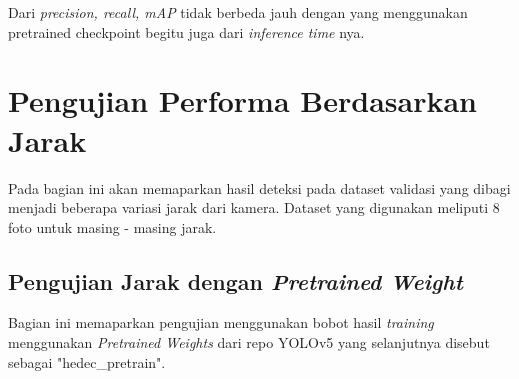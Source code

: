 Dari \emph{precision, recall, mAP} tidak berbeda jauh dengan yang menggunakan pretrained checkpoint begitu juga dari \emph{inference time} nya.

\section{Pengujian Performa Berdasarkan Jarak}
\label{sec:ujiberdasarkanjarak}

Pada bagian ini akan memaparkan hasil deteksi pada dataset validasi yang dibagi menjadi beberapa variasi jarak dari kamera. Dataset yang digunakan meliputi 8 foto untuk masing - masing jarak.

\subsection{Pengujian Jarak dengan \emph{Pretrained Weight}}
\label{subsec:ujijarak_pretrainedweight}

\par Bagian ini memaparkan pengujian menggunakan bobot hasil \emph{training} menggunakan \emph{Pretrained Weights}
dari repo YOLOv5 yang selanjutnya disebut sebagai "hedec\_pretrain". 


